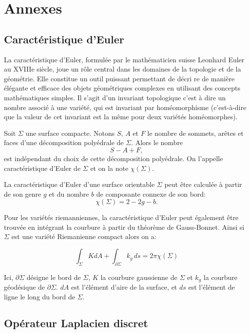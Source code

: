 \chapter{Annexes}
\label{chap:annexes}

\section{Caractéristique d'Euler}

La caractéristique d'Euler, formulée par le mathématicien suisse Leonhard Euler au XVIIIe siècle, joue un rôle central dans les domaines de la topologie et de la géométrie. Elle constitue un outil puissant permettant de décri re de manière élégante et efficace des objets géométriques complexes en utilisant des concepts mathématiques simples. Il s'agit d'un invariant topologique c'est à dire un nombre associé à une variété, qui est invariant par homéomorphisme (c’est-à-dire que la valeur de cet invariant est la même pour deux variétés homéomorphes).

\begin{definition}
Soit $\Sigma$ une surface compacte. Notons $S$, $A$ et $F$ le nombre de sommets, arêtes et faces d'une décomposition polyédrale de $\Sigma$. Alors le nombre
$$
S-A+F,
$$
est indépendant du choix de cette décomposition polyédrale. On l’appelle caractéristique d’Euler de $\Sigma$ et on la note $\chi(\Sigma)$.
\end{definition}

La caractéristique d'Euler d'une surface orientable $\Sigma$ peut être calculée à partir de son genre $g$ et du nombre $b$ de composante connexe de son bord:
$$
\chi(\Sigma) = 2-2g-b.
$$

Pour les variétés riemanniennes, la caractéristique d'Euler peut également être trouvée en intégrant la courbure à partir du théorème de Gauss-Bonnet. Ainsi si $\Sigma$ est une variété Riemanienne compact alors on a:

$$
\displaystyle\int_\Sigma KdA+\int_{\partial\Sigma} k_{g}\,ds=2\pi \chi (\Sigma)
$$

Ici, $\partial\Sigma$ désigne le bord de $\Sigma$, $K$ la courbure gaussienne de $\Sigma$ et $k_g$ la courbure géodésique de $\partial\Sigma$. $dA$ est l'élément d'aire de la surface, et $ds$ est l'élément de ligne le long du bord de $\Sigma$.


\section{Opérateur Laplacien discret}

